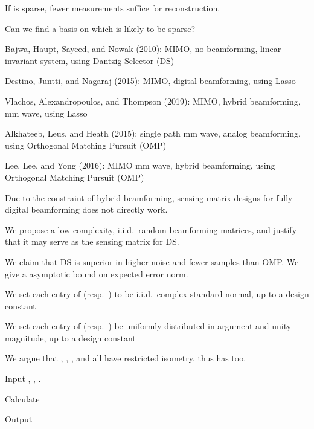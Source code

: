 {
\blank [big]

\I If  is sparse, fewer measurements suffice for reconstruction.

\I Can we find a basis on which  is likely to be sparse?
}
{
\I Bajwa, Haupt, Sayeed, and Nowak (2010): MIMO, no beamforming, linear invariant system, using Dantzig Selector (DS)

\I Destino, Juntti, and Nagaraj (2015): MIMO, digital beamforming, using Lasso

\I Vlachos, Alexandropoulos, and Thompson (2019): MIMO, hybrid beamforming, mm wave, using Lasso

\I Alkhateeb, Leus, and Heath (2015): single path mm wave, analog beamforming, using Orthogonal Matching Pursuit (OMP)

\I Lee, Lee, and Yong (2016): MIMO mm wave, hybrid beamforming, using Orthogonal Matching Pursuit (OMP)
}
{
\I Due to the constraint of hybrid beamforming, sensing matrix designs for fully digital beamforming does not directly work.

\I We propose a low complexity, i.i.d.\ random beamforming matrices, and justify that it may serve as the sensing matrix for DS.

\I We claim that DS is superior in higher noise and fewer samples than OMP.
\I We give a asymptotic bound on expected error norm.
}
{
\I We set each entry of  (resp.\ ) to be i.i.d.\ complex standard normal, up to a design constant

\I We set each entry of  (resp.\ ) be uniformly distributed in argument and unity magnitude, up to a design constant

\I We argue that , , , and  all have restricted isometry, thus  has too.
}
{
\I Input , , .

\I Calculate

\I Output 
}


